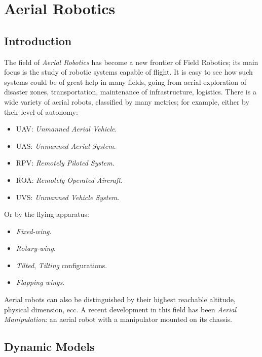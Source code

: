 \chapter{Aerial Robotics}
\section{Introduction}
The field of \textit{Aerial Robotics} has become a new frontier of Field Robotics; its main focus is the study of robotic systems capable of flight. It is easy to see how such systems could be of great help in many fields, going from aerial exploration of disaster zones, transportation, maintenance of infrastructure, logistics. There is a wide variety of aerial robots, classified by many metrics; for example, either by their level of autonomy:
\begin{itemize}
    \item UAV: \textit{Unmanned Aerial Vehicle}.
    \item UAS: \textit{Unmanned Aerial System}.
    \item RPV: \textit{Remotely Piloted System}.
    \item ROA: \textit{Remotely Operated Aircraft}.
    \item UVS: \textit{Unmanned Vehicle System}.
\end{itemize}
Or by the flying apparatus:
\begin{itemize}
    \item \textit{Fixed-wing}.
    \item \textit{Rotary-wing}.
    \item \textit{Tilted}, \textit{Tilting} configurations.
    \item \textit{Flapping wings}.
\end{itemize}
Aerial robots can also be distinguished by their highest reachable altitude, physical dimension, ecc. A recent development in this field has been \textit{Aerial Manipulation}: an aerial robot with a manipulator mounted on its chassis. 
\section{Dynamic Models}
